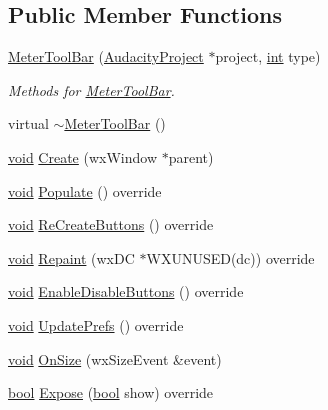 \subsection*{Public Member Functions}
\begin{DoxyCompactItemize}
\item 
\hyperlink{class_meter_tool_bar_a893a5ae2c34ab918d070c127576d2d2c}{Meter\+Tool\+Bar} (\hyperlink{class_audacity_project}{Audacity\+Project} $\ast$project, \hyperlink{xmltok_8h_a5a0d4a5641ce434f1d23533f2b2e6653}{int} type)
\begin{DoxyCompactList}\small\item\em Methods for \hyperlink{class_meter_tool_bar}{Meter\+Tool\+Bar}. \end{DoxyCompactList}\item 
virtual \hyperlink{class_meter_tool_bar_a1e30499b7cf9a3eea67ad354bb0810a6}{$\sim$\+Meter\+Tool\+Bar} ()
\item 
\hyperlink{sound_8c_ae35f5844602719cf66324f4de2a658b3}{void} \hyperlink{class_meter_tool_bar_aa04ac4b96d5a4c54b6d679f829c8e738}{Create} (wx\+Window $\ast$parent)
\item 
\hyperlink{sound_8c_ae35f5844602719cf66324f4de2a658b3}{void} \hyperlink{class_meter_tool_bar_ab23c000fdaa294003476f44818b834c5}{Populate} () override
\item 
\hyperlink{sound_8c_ae35f5844602719cf66324f4de2a658b3}{void} \hyperlink{class_meter_tool_bar_a96435bf5cfe27e06f6ba48c4490f299c}{Re\+Create\+Buttons} () override
\item 
\hyperlink{sound_8c_ae35f5844602719cf66324f4de2a658b3}{void} \hyperlink{class_meter_tool_bar_ab25b95281db82edf7326e6007dd05e36}{Repaint} (wx\+DC $\ast$W\+X\+U\+N\+U\+S\+ED(dc)) override
\item 
\hyperlink{sound_8c_ae35f5844602719cf66324f4de2a658b3}{void} \hyperlink{class_meter_tool_bar_a67d842b59c717a73e93a4f65da54045d}{Enable\+Disable\+Buttons} () override
\item 
\hyperlink{sound_8c_ae35f5844602719cf66324f4de2a658b3}{void} \hyperlink{class_meter_tool_bar_a21cc887856b3bebc80e28490c74f6e9a}{Update\+Prefs} () override
\item 
\hyperlink{sound_8c_ae35f5844602719cf66324f4de2a658b3}{void} \hyperlink{class_meter_tool_bar_a80a4d33a7993827e896972bbd3d474be}{On\+Size} (wx\+Size\+Event \&event)
\item 
\hyperlink{mac_2config_2i386_2lib-src_2libsoxr_2soxr-config_8h_abb452686968e48b67397da5f97445f5b}{bool} \hyperlink{class_meter_tool_bar_aeb03086f685cb39980510bf55851eb2e}{Expose} (\hyperlink{mac_2config_2i386_2lib-src_2libsoxr_2soxr-config_8h_abb452686968e48b67397da5f97445f5b}{bool} show) override

\end{DoxyCompactItemize}
